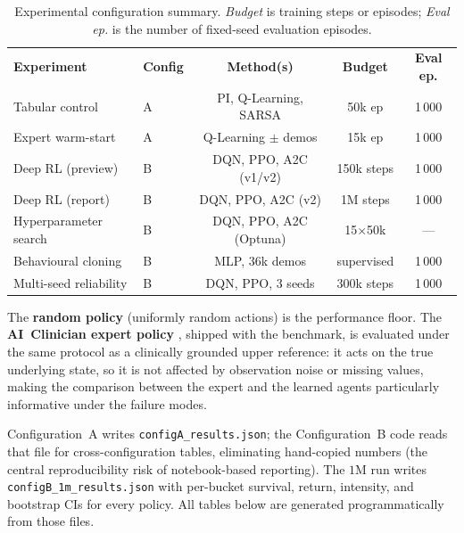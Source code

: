 \documentclass[11pt,a4paper]{article}
\newcommand{\tH}[1]{\textcolor{novagreen}{\textbf{#1}}}
\newcommand{\gmid}{\arrayrulecolor{novagreen}\midrule\arrayrulecolor{black}}
\begin{document}
\begin{table}[H]
\centering
\small
\begin{tabular}{llccc}
\toprule
\tH{Experiment} & \tH{Config} & \tH{Method(s)} & \tH{Budget} & \tH{Eval ep.} \\
\gmid
Tabular control       & A & PI, Q-Learning, SARSA   & 50k ep         & 1\,000 \\
Expert warm-start     & A & Q-Learning $\pm$ demos   & 15k ep         & 1\,000 \\
Deep RL (preview)     & B & DQN, PPO, A2C (v1/v2)   & 150k steps     & 1\,000 \\
Deep RL (report)      & B & DQN, PPO, A2C (v2)      & 1M steps       & 1\,000 \\
Hyperparameter search & B & DQN, PPO, A2C (Optuna)  & 15$\times$50k  & --- \\
Behavioural cloning   & B & MLP, $36$k demos        & supervised     & 1\,000 \\
Multi-seed reliability& B & DQN, PPO, 3 seeds       & 300k steps     & 1\,000 \\
\bottomrule
\end{tabular}
\caption{Experimental configuration summary. \emph{Budget} is training steps or
episodes; \emph{Eval ep.} is the number of fixed-seed evaluation episodes.}
\label{tab:setup}
\end{table}

The \textbf{random policy} (uniformly random actions) is the performance floor.
The \textbf{AI~Clinician expert policy} \cite{komorowski2018}, shipped with the
benchmark, is evaluated under the same protocol as a clinically grounded upper
reference: it acts on the true underlying state, so it is not affected by
observation noise or missing values, making the comparison between the expert and
the learned agents particularly informative under the failure modes.

Configuration~A writes \texttt{configA\_results.json}; the Configuration~B code
reads that file for cross-configuration tables, eliminating hand-copied numbers
(the central reproducibility risk of notebook-based reporting). The $1$M run writes
\texttt{configB\_1m\_results.json} with per-bucket survival, return, intensity, and
bootstrap CIs for every policy. All tables below are generated programmatically from
those files.
\end{document}
